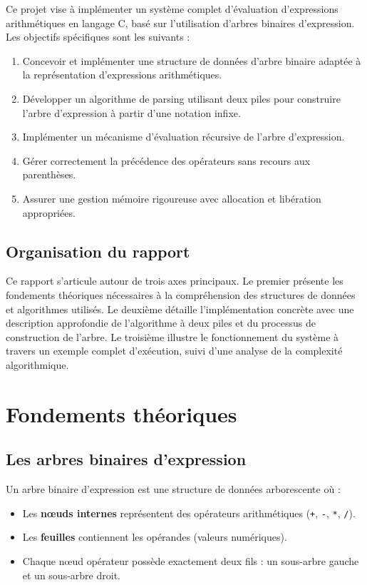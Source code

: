 \documentclass[12pt,a4paper]{article}
\begin{document}
Ce projet vise à implémenter un système complet d'évaluation d'expressions arithmétiques en langage C, basé sur l'utilisation d'arbres binaires d'expression. Les objectifs spécifiques sont les suivants :

\begin{enumerate}
    \item Concevoir et implémenter une structure de données d'arbre binaire adaptée à la représentation d'expressions arithmétiques.
    \item Développer un algorithme de parsing utilisant deux piles pour construire l'arbre d'expression à partir d'une notation infixe.
    \item Implémenter un mécanisme d'évaluation récursive de l'arbre d'expression.
    \item Gérer correctement la précédence des opérateurs sans recours aux parenthèses.
    \item Assurer une gestion mémoire rigoureuse avec allocation et libération appropriées.
\end{enumerate}

\subsection{Organisation du rapport}

Ce rapport s'articule autour de trois axes principaux. Le premier présente les fondements théoriques nécessaires à la compréhension des structures de données et algorithmes utilisés. Le deuxième détaille l'implémentation concrète avec une description approfondie de l'algorithme à deux piles et du processus de construction de l'arbre. Le troisième illustre le fonctionnement du système à travers un exemple complet d'exécution, suivi d'une analyse de la complexité algorithmique.

\section{Fondements théoriques}

\subsection{Les arbres binaires d'expression}

Un arbre binaire d'expression est une structure de données arborescente où :
\begin{itemize}
    \item Les \textbf{nœuds internes} représentent des opérateurs arithmétiques (\texttt{+}, \texttt{-}, \texttt{*}, \texttt{/}).
    \item Les \textbf{feuilles} contiennent les opérandes (valeurs numériques).
    \item Chaque nœud opérateur possède exactement deux fils : un sous-arbre gauche et un sous-arbre droit.
\end{itemize}
\end{document}
